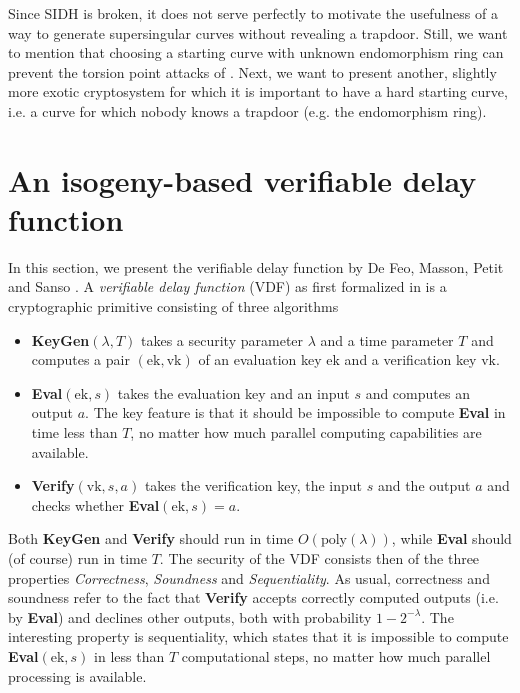 Since SIDH is broken, it does not serve perfectly to motivate the usefulness of a way to generate supersingular curves without revealing a trapdoor.
Still, we want to mention that choosing a starting curve with unknown endomorphism ring can prevent the torsion point attacks of \cite{torsion_point_attack}.
Next, we want to present another, slightly more exotic cryptosystem for which it is important to have a hard starting curve, i.e. a curve for which nobody knows a trapdoor (e.g. the endomorphism ring).

\section{An isogeny-based verifiable delay function}
\label{sec:verifiable_delay_function}
In this section, we present the verifiable delay function by De Feo, Masson, Petit and Sanso \cite{verifiable_delay_function}.
A \emph{verifiable delay function} (VDF) as first formalized in \cite{definition_verifiable_delay_function} is a cryptographic primitive consisting of three algorithms
\begin{itemize}
    \item \textbf{KeyGen}$(\lambda, T)$ takes a security parameter $\lambda$ and a time parameter $T$ and computes a pair $(\mathrm{ek}, \mathrm{vk})$ of an evaluation key $\mathrm{ek}$ and a verification key $\mathrm{vk}$.
    \item \textbf{Eval}$(\mathrm{ek}, s)$ takes the evaluation key and an input $s$ and computes an output $a$. 
    The key feature is that it should be impossible to compute \textbf{Eval} in time less than $T$, no matter how much parallel computing capabilities are available.
    \item \textbf{Verify}$(\mathrm{vk}, s, a)$ takes the verification key, the input $s$ and the output $a$ and checks whether \textbf{Eval}$(\mathrm{ek}, s) = a$.
\end{itemize}
Both \textbf{KeyGen} and \textbf{Verify} should run in time $O(\mathrm{poly}(\lambda))$, while \textbf{Eval} should (of course) run in time $T$.
The security of the VDF consists then of the three properties \emph{Correctness}, \emph{Soundness} and \emph{Sequentiality}.
As usual, correctness and soundness refer to the fact that \textbf{Verify} accepts correctly computed outputs (i.e. by \textbf{Eval}) and declines other outputs, both with probability $1 - 2^{-\lambda}$.
The interesting property is sequentiality, which states that it is impossible to compute \textbf{Eval}$(\mathrm{ek}, s)$ in less than $T$ computational steps, no matter how much parallel processing is available.

